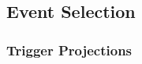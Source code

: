\documentclass[11pt]{article}
\begin{document}


\subsection{Event Selection}

\subsubsection{Trigger Projections}
\end{document}
